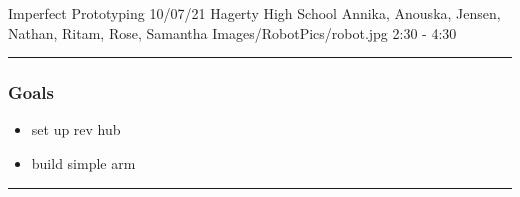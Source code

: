\insertmeeting 
	{Imperfect Prototyping} 
	{10/07/21}
	{Hagerty High School}
	{Annika, Anouska, Jensen, Nathan, Ritam, Rose, Samantha}
	{Images/RobotPics/robot.jpg}
	{2:30 - 4:30}
	
\noindent\hfil\rule{\textwidth}{.4pt}\hfil
\subsubsection*{Goals}
\begin{itemize}
    \item set up rev hub
    \item build simple arm 

\end{itemize} 

\noindent\hfil\rule{\textwidth}{.4pt}\hfil

